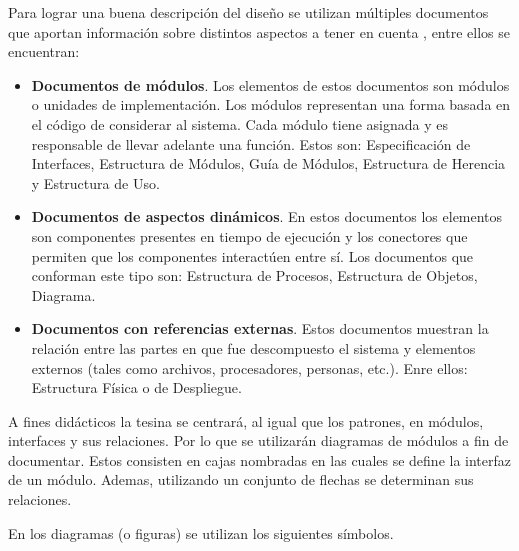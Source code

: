 Para lograr una buena descripción del diseño se utilizan múltiples documentos que aportan información sobre distintos aspectos a tener en cuenta \cite{ClementsEtAl2010}, entre ellos se encuentran:

\begin{itemize}
\item \textbf{Documentos de módulos}. Los elementos de estos documentos son módulos o unidades de implementación. Los módulos representan una forma basada en el código de considerar al sistema. Cada módulo tiene asignada y es responsable de llevar adelante una función. Estos son: Especificación de Interfaces, Estructura de Módulos, Guía de Módulos, Estructura de Herencia y Estructura de Uso.
\item \textbf{Documentos de aspectos dinámicos}. En estos documentos los elementos son componentes presentes en tiempo de ejecución y los conectores que permiten que los componentes interactúen entre sí. Los documentos que conforman este tipo son: Estructura de Procesos, Estructura de Objetos, Diagrama.
\item \textbf{Documentos con referencias externas}. Estos documentos muestran la relación entre las partes en que fue descompuesto el sistema y elementos externos (tales como archivos, procesadores, personas, etc.). Enre ellos: Estructura Física o de Despliegue.
\end{itemize}

A fines didácticos la tesina se centrará, al igual que los patrones, en módulos, interfaces y sus relaciones. Por lo que se utilizarán diagramas de módulos a fin de documentar. Estos consisten en cajas nombradas en las cuales se define la interfaz de un módulo. Ademas, utilizando un conjunto de flechas se determinan sus relaciones.

En los diagramas (o figuras) se utilizan los siguientes símbolos. 


